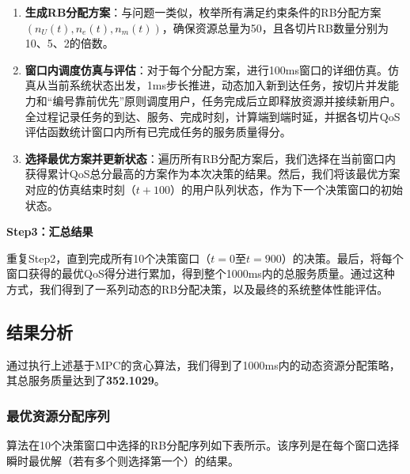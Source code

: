 \begin{enumerate}
    \item \textbf{生成RB分配方案}：与问题一类似，枚举所有满足约束条件的RB分配方案 $(n_U(t), n_e(t), n_m(t))$，确保资源总量为50，且各切片RB数量分别为10、5、2的倍数。

    \item \textbf{窗口内调度仿真与评估}：对于每个分配方案，进行100ms窗口的详细仿真。仿真从当前系统状态出发，1ms步长推进，动态加入新到达任务，按切片并发能力和“编号靠前优先”原则调度用户，任务完成后立即释放资源并接续新用户。全过程记录任务的到达、服务、完成时刻，计算端到端时延，并据各切片QoS评估函数统计窗口内所有已完成任务的服务质量得分。
    
    \item \textbf{选择最优方案并更新状态}：遍历所有RB分配方案后，我们选择在当前窗口内获得累计QoS总分最高的方案作为本次决策的结果。然后，我们将该最优方案对应的仿真结束时刻（$t+100$）的用户队列状态，作为下一个决策窗口的初始状态。
\end{enumerate}

\textbf{Step3：汇总结果}

重复Step2，直到完成所有10个决策窗口（$t=0$至$t=900$）的决策。最后，将每个窗口获得的最优QoS得分进行累加，得到整个1000ms内的总服务质量。通过这种方式，我们得到了一系列动态的RB分配决策，以及最终的系统整体性能评估。

\subsection{结果分析}

通过执行上述基于MPC的贪心算法，我们得到了1000ms内的动态资源分配策略，其总服务质量达到了\textbf{352.1029}。

\subsubsection{最优资源分配序列}

算法在10个决策窗口中选择的RB分配序列如下表所示。该序列是在每个窗口选择瞬时最优解（若有多个则选择第一个）的结果。

